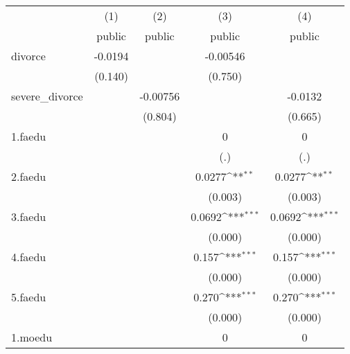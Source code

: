 {
\def\sym#1{\ifmmode^{#1}\else\(^{#1}\)\fi}
\begin{tabular}{l*{4}{c}}
\hline\hline
            &\multicolumn{1}{c}{(1)}&\multicolumn{1}{c}{(2)}&\multicolumn{1}{c}{(3)}&\multicolumn{1}{c}{(4)}\\
            &\multicolumn{1}{c}{public}&\multicolumn{1}{c}{public}&\multicolumn{1}{c}{public}&\multicolumn{1}{c}{public}\\
\hline
divorce     &     -0.0194         &                     &    -0.00546         &                     \\
            &     (0.140)         &                     &     (0.750)         &                     \\
[1em]
severe\_divorce&                     &    -0.00756         &                     &     -0.0132         \\
            &                     &     (0.804)         &                     &     (0.665)         \\
[1em]
1.faedu     &                     &                     &           0         &           0         \\
            &                     &                     &         (.)         &         (.)         \\
[1em]
2.faedu     &                     &                     &      0.0277\sym{**} &      0.0277\sym{**} \\
            &                     &                     &     (0.003)         &     (0.003)         \\
[1em]
3.faedu     &                     &                     &      0.0692\sym{***}&      0.0692\sym{***}\\
            &                     &                     &     (0.000)         &     (0.000)         \\
[1em]
4.faedu     &                     &                     &       0.157\sym{***}&       0.157\sym{***}\\
            &                     &                     &     (0.000)         &     (0.000)         \\
[1em]
5.faedu     &                     &                     &       0.270\sym{***}&       0.270\sym{***}\\
            &                     &                     &     (0.000)         &     (0.000)         \\
[1em]
1.moedu     &                     &                     &           0         &           0         \\

\end{tabular}}
